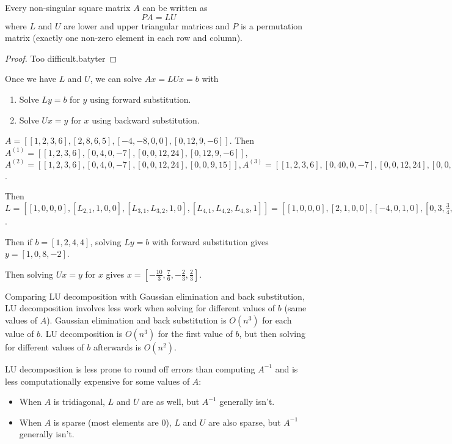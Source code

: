 \begin{theorem}
	Every non-singular square matrix $A$ can be written as
	\[
		PA = LU
	\]
	where $L$ and $U$ are lower and upper triangular matrices and $P$ is a permutation matrix (exactly one non-zero element in each row and column).
\end{theorem}

\begin{proof}
	Too difficult.batyter
\end{proof}

\begin{remark}
	Once we have $L$ and $U$, we can solve $Ax = LUx = b$ with
	\begin{enumerate}
		\item Solve $Ly = b$ for $y$ using forward substitution.
		\item Solve $Ux = y$ for $x$ using backward substitution.
	\end{enumerate}
\end{remark}

\begin{example}
	$A = [[1, 2, 3, 6], [2, 8, 6, 5], [-4, -8, 0, 0], [0, 12, 9, -6]]$. Then $A^{(1)} = [[1, 2, 3, 6], [0, 4, 0, -7], [0, 0, 12, 24], [0, 12, 9, -6]]$, $A^{(2)} = [[1, 2, 3, 6], [0, 4, 0, -7], [0, 0, 12, 24], [0, 0, 9, 15]], A^{(3)} = [[1, 2, 3, 6], [0, 40, 0, -7], [0, 0, 12, 24], [0, 0, 0, -3]]$.

	Then $L = [[1, 0, 0, 0], [L_{2, 1}, 1, 0, 0], [L_{3, 1}, L_{3, 2}, 1, 0], [L_{4, 1}, L_{4, 2}, L_{4, 3}, 1]] = [[1, 0, 0, 0], [2, 1, 0, 0], [-4, 0, 1, 0], [0, 3, \frac{3}{4}, 1]]$.

	Then if $b = [1, 2, 4, 4]$, solving $Ly = b$ with forward substitution gives $y = [1, 0, 8, -2]$.

	Then solving $Ux = y$ for $x$ gives $x = [-\frac{10}{3}, \frac{7}{6}, -\frac{2}{3}, \frac{2}{3}]$.
\end{example}

\begin{remark}
	Comparing LU decomposition with Gaussian elimination and back substitution, LU decomposition involves less work when solving for different values of $b$ (same values of $A$). Gaussian elimination and back substitution is $O(n^3)$ for each value of $b$. LU decomposition is $O(n^3)$ for the first value of $b$, but then solving for different values of $b$ afterwards is $O(n^2)$.
\end{remark}

\begin{remark}
	LU decomposition is less prone to round off errors than computing $A^{-1}$ and is less computationally expensive for some values of $A$:
	\begin{itemize}
		\item When $A$ is tridiagonal, $L$ and $U$ are as well, but $A^{-1}$ generally isn't.
		\item When $A$ is sparse (most elements are $0$), $L$ and $U$ are also sparse, but $A^{-1}$ generally isn't.
	\end{itemize}
\end{remark}

